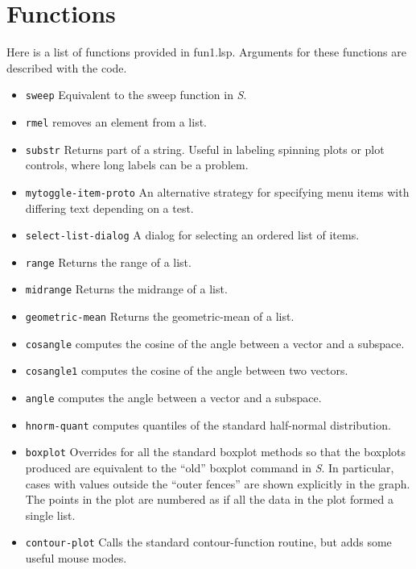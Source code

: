 \section{Functions}
Here is a list of functions provided in fun1.lsp.  Arguments for
these functions are described with the code.
\begin{itemize}
\item {\tt sweep} Equivalent to the sweep function in {\sl S}.
\item {\tt rmel} removes an element from a list.
\item {\tt substr} Returns part of a string.  Useful in labeling spinning
plots or plot controls, where long labels can be a problem.
\item {\tt mytoggle-item-proto}  An alternative strategy for specifying menu
items with differing text depending on a test.
\item {\tt select-list-dialog}  A dialog for selecting an ordered list of
items.
\item {\tt range} Returns the range of a list.
\item {\tt midrange} Returns the midrange of a list.
\item {\tt geometric-mean} Returns the geometric-mean of a list.
\item {\tt cosangle} computes the cosine of the angle between a vector and a
subspace.
\item {\tt cosangle1} computes the cosine of the angle between two vectors.
\item {\tt angle} computes the angle between a vector and a subspace.
\item {\tt hnorm-quant} computes quantiles of the standard half-normal
distribution.
\item {\tt boxplot}  Overrides for all the standard boxplot methods so that
the boxplots produced are equivalent to the ``old'' boxplot command in 
{\sl S}.  In particular, cases with values outside the ``outer fences'' are
shown explicitly in the graph.  The points in the plot are numbered as if all
the data in the plot formed a single list.  
\item {\tt contour-plot}  Calls the standard contour-function routine, but
adds some useful mouse modes.
\end{itemize}
